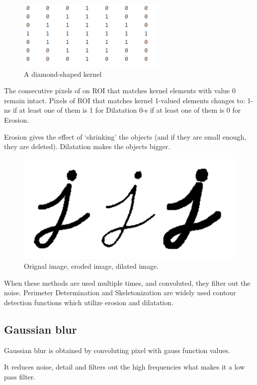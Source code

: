 \documentclass[12pt,twoside,a4paper]{article}
\begin{document}
 
\begin{figure}[H]
\centering
\includegraphics[width=0.4\paperwidth]{diam}
\caption{A diamond-shaped kernel\cite{morph}}
\end{figure}

The consecutive pixels of on ROI that matches kernel elements with value 0 remain intact.
Pixels of ROI that matches kernel 1-valued elements changes to:
1-ns if at least one of them is 1 for Dilatation
0-s if at least one of them is 0 for Erosion.

Erosion gives the effect of ‘shrinking’ the objects (and if they are small enough, they are deleted).
Dilatation makes the objects bigger.

 
\begin{figure}[H]
\centering
\includegraphics[width=0.4\paperwidth]{lett}
\caption{Orignal image, eroded image, dilated image.\cite{erdil}}
\end{figure}


When these methods are used multiple times, and convoluted, they filter out the noise.
Perimeter Determination and Skeletonization are widely used contour detection functions which utilize erosion and dilatation\cite{erdil}.


\subsection{Gaussian blur}

Gaussian blur is obtained by convoluting pixel with gauss function values. 

It reduces noise, detail and filters out the high frequencies what makes it a low pass filter.\cite{cv}
\end{document}
